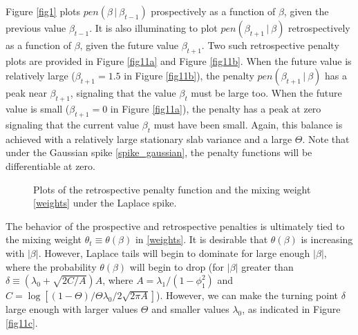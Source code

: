 \documentclass[ba]{imsart}
\numberwithin{equation}{section}
\theoremstyle{plain}
\def\C {\,|\:}
\def\C {\,|\:}
\begin{document}
Figure \ref{fig1} plots $pen(\beta\C\beta_{t-1})$ prospectively as a function of $\beta$, given the previous value $\beta_{t-1}$. It is also illuminating to plot $pen(\beta_{t+1}\C\beta)$ retrospectively as a function of $\beta$, given the future value $\beta_{t+1}$. Two such retrospective penalty plots are provided in Figure \ref{fig11a} and Figure \ref{fig11b}. When the future value is relatively large ($\beta_{t+1}=1.5$ in Figure \ref{fig11b}),  the penalty $pen(\beta_{t+1}\C\beta)$ has a peak near $\beta_{t+1}$, signaling that the value $\beta_{t}$ must be large too. When the future value is small ($\beta_{t+1}=0$ in Figure \ref{fig11a}), the penalty has a peak at zero signaling that the current value $\beta_{t}$ must have been small. Again, this balance is achieved with a relatively large stationary slab variance and a large  $\Theta$.  Note that under the Gaussian spike   \eqref{spike_gaussian}, the penalty functions will be differentiable at zero.


\begin{figure}[!t]
    \caption{Plots of the retrospective penalty function and the mixing weight \eqref{weights} under the Laplace spike.}    \label{fig11}
\end{figure}



The behavior of  the prospective and retrospective penalties is ultimately tied to the mixing weight $\theta_t\equiv\theta(\beta)$  in \eqref{weights}. It is desirable that $\theta(\beta)$ is increasing with  $|\beta|$. However, Laplace tails  will begin to dominate for large enough $|\beta|$, where the probability $\theta(\beta)$ will begin to drop (for $|\beta|$ greater than $\delta\equiv(\lambda_0+\sqrt{2C/A})A$, where $A=\lambda_1/(1-\phi_1^2)$ and $C=\log[(1-\Theta)/\Theta\lambda_0/2\sqrt{2\pi A}]$). However, we can make the turning point $\delta$ large enough with larger values $\Theta$ and smaller values $\lambda_0$, as indicated in Figure \ref{fig11c}. 
\end{document}
